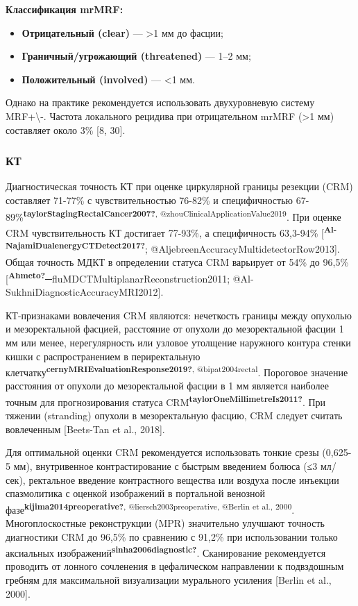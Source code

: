 \documentclass[
  russian,
  12pt,
  a4paper,
]{report}
\begin{document}
\textbf{Классификация mrMRF:}

\begin{itemize}
\item
  \textbf{Отрицательный (clear)} --- \textgreater1 мм до фасции;
\item
  \textbf{Граничный/угрожающий (threatened)} --- 1--2 мм;
\item
  \textbf{Положительный (involved)} --- \textless1 мм.
\end{itemize}

Однако на практике рекомендуется использовать двухуровневую систему
MRF+\textbackslash-. Частота локального рецидива при отрицательном mrMRF
(\textgreater1 мм) составляет около 3\% {[}8, 30{]}.

\subsubsection{КТ}\label{ux43aux442-3}

Диагностическая точность КТ при оценке циркулярной границы резекции
(CRM) составляет 71-77\% с чувствительностью 76-82\% и специфичностью
67-89\%\textsuperscript{\textbf{taylorStagingRectalCancer2007?},
@zhouClinicalApplicationValue2019}. При оценке CRM чувствительность КТ
достигает 77-93\%, а специфичность 63,3-94\%
{[}\textsuperscript{\textbf{Al-NajamiDualenergyCTDetect2017?}};
@AljebreenAccuracyMultidetectorRow2013{]}. Общая точность МДКТ в
определении статуса CRM варьирует от 54\% до 96,5\%
{[}\textsuperscript{\textbf{Ahmeto?}}─fluMDCTMultiplanarReconstruction2011;
@Al-SukhniDiagnosticAccuracyMRI2012{]}.

КТ-признаками вовлечения CRM являются: нечеткость границы между опухолью
и мезоректальной фасцией, расстояние от опухоли до мезоректальной фасции
1 мм или менее, нерегулярность или узловое утолщение наружного контура
стенки кишки с распространением в периректальную
клетчатку\textsuperscript{\textbf{cernyMRIEvaluationResponse2019?},
@bipat2004rectal}. Пороговое значение расстояния от опухоли до
мезоректальной фасции в 1 мм является наиболее точным для
прогнозирования статуса
CRM\textsuperscript{\textbf{taylorOneMillimetreIs2011?}}. При тяжении
(stranding) опухоли в мезоректальную фасцию, CRM следует считать
вовлеченным {[}Beets-Tan et al., 2018{]}.

Для оптимальной оценки CRM рекомендуется использовать тонкие срезы
(0,625-5 мм), внутривенное контрастирование с быстрым введением болюса
(≤3 мл/сек), ректальное введение контрастного вещества или воздуха после
инъекции спазмолитика с оценкой изображений в портальной венозной
фазе\textsuperscript{\textbf{kijima2014preoperative?},
@liersch2003preoperative, @Berlin et al., 2000}. Многоплоскостные
реконструкции (MPR) значительно улучшают точность диагностики CRM до
96,5\% по сравнению с 91,2\% при использовании только аксиальных
изображений\textsuperscript{\textbf{sinha2006diagnostic?}}. Сканирование
рекомендуется проводить от лонного сочленения в цефалическом направлении
к подвздошным гребням для максимальной визуализации мурального усиления
{[}Berlin et al., 2000{]}.
\end{document}
